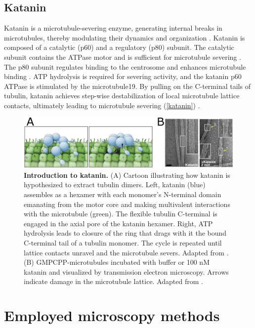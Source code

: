 \subsection{Katanin}
Katanin is a microtubule-severing enzyme, generating internal breaks in microtubules, thereby modulating their dynamics and organization \parencite{ROLLMECAK201096}. Katanin is composed of a catalytic (p60) and a regulatory (p80) subunit. The catalytic subunit contains the ATPase motor and is sufficient for microtubule severing \parencite{McNally2014}. The p80 subunit regulates binding to the centrosome and enhances microtubule binding \parencite{Joly3604}. ATP hydrolysis is required for severing activity, and the katanin p60 ATPase is stimulated by the microtubule19. By pulling on the C-terminal tails of tubulin, katanin achieves step-wise destabilization of local microtubule lattice contacts, ultimately leading to microtubule severing (\autoref{katanin}) \parencite{McNally2014}.
\label{sec:katanin}

\begin{figure}[h!tb]
\centering
\includegraphics[scale=1.1]{Figures/katanin.png}
\caption[Introduction to katanin.]{\textbf{Introduction to katanin.}
(A) Cartoon illustrating how katanin is hypothesized to extract tubulin dimers. Left, katanin (blue) assembles as a hexamer with each monomer's N-terminal domain emanating from the motor core and making multivalent interactions with the microtubule (green). The flexible tubulin C-terminal is engaged in the axial pore of the katanin hexamer. Right, ATP hydrolysis leads to closure of the ring that drags with it the bound C-terminal tail of a tubulin monomer. The cycle is repeated until lattice contacts unravel and the microtubule severs. Adapted from \cite{Zehr2017}. (B) GMPCPP-microtubules incubated with buffer or 100 nM katanin and visualized by transmission electron microscopy. Arrows indicate damage in the microtubule lattice. Adapted from \cite{Grigorieff2018}.
	}\label{katanin}
\end{figure}

\section{Employed microscopy methods}
\label{sec:microscopy}
